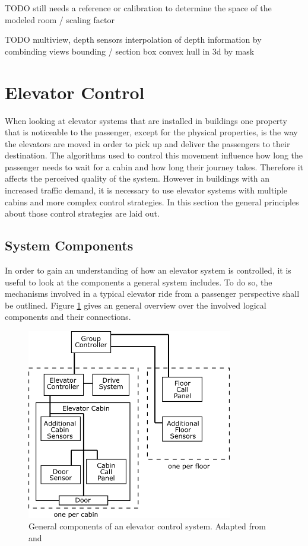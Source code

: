 TODO still needs a reference or calibration to determine the space of the modeled room / scaling factor

TODO
multiview, depth sensors
interpolation of depth information by combinding views
bounding / section box
convex hull in 3d by mask


\section{Elevator Control}

When looking at elevator systems that are installed in buildings
one property that is noticeable to the passenger, except for the physical properties, is the way the elevators are moved in order to pick up and deliver the passengers to their destination.
The algorithms used to control this movement influence how long the passenger needs to wait for a cabin and how long their journey takes.
Therefore it affects the perceived quality of the system.
However in buildings with an increased traffic demand, it is necessary to use elevator systems with multiple cabins and more complex control strategies.
In this section the general principles about those control strategies are laid out.

\subsection{System Components}

In order to gain an understanding of how an elevator system is controlled,
it is useful to look at the components a general system includes.
To do so, the mechanisms involved in a typical elevator ride 
from a passenger perspective shall be outlined.
Figure \ref{fig:sota:systemcomponents} gives an general overview over the involved logical components and their connections.

\begin{figure}[hbt]
	\centering
	\includegraphics[width=0.8\textwidth, keepaspectratio]{resources/systemcomponets}
	\caption[General components of an elevator control system]{\label{fig:sota:systemcomponents} General components of an elevator control system. Adapted from \textcite[][pp.~4,16]{xang2016trafficlist} and  \textcite[][p.~10]{siikonen1997models}}
\end{figure}

